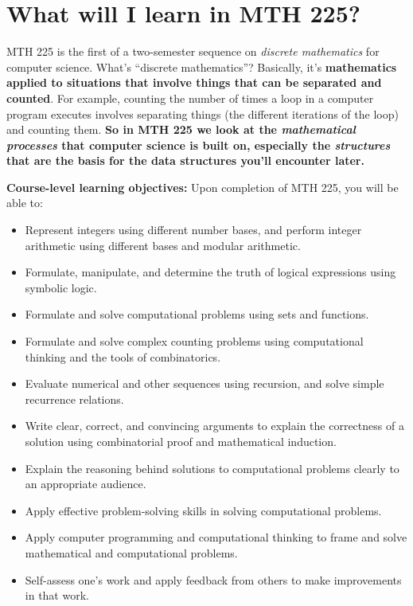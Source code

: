 \documentclass[]{article}
\providecommand{\tightlist}{%
  \setlength{\itemsep}{0pt}\setlength{\parskip}{0pt}}
\begin{document}
\vfill \eject

\section{What will I learn in MTH 225?}

MTH 225 is the first of a two-semester sequence on \textit{discrete mathematics} for computer science. What's ``discrete mathematics''? Basically, it's \textbf{mathematics applied to situations that involve things that can be separated and counted}. For example, counting the number of times a loop in a computer program executes involves separating things (the different iterations of the loop) and counting them.  \textbf{So in MTH 225 we look at the \textit{mathematical processes} that computer science is built on, especially the \textit{structures} that are the basis for the data structures you'll encounter later.} 

\textbf{Course-level learning objectives:} Upon completion of MTH 225, you will be able to:
\begin{itemize}
\tightlist
    \item Represent integers using different number bases, and perform integer arithmetic using different bases and modular arithmetic.
    \item Formulate, manipulate, and determine the truth of logical expressions using symbolic logic.
    \item Formulate and solve computational problems using sets and functions.
    \item Formulate and solve complex counting problems using computational thinking and the tools of combinatorics.
    \item Evaluate numerical and other sequences using recursion, and solve simple recurrence relations.
    \item Write clear, correct, and convincing arguments to explain the correctness of a solution using combinatorial proof and mathematical induction.
    \item Explain the reasoning behind solutions to computational problems clearly to an appropriate audience.
    \item Apply effective problem-solving skills in solving computational problems.
    \item Apply computer programming and computational thinking to frame and solve mathematical and computational problems.
    \item Self-assess one's work and apply feedback from others to make improvements in that work.
\end{itemize}
\end{document}
